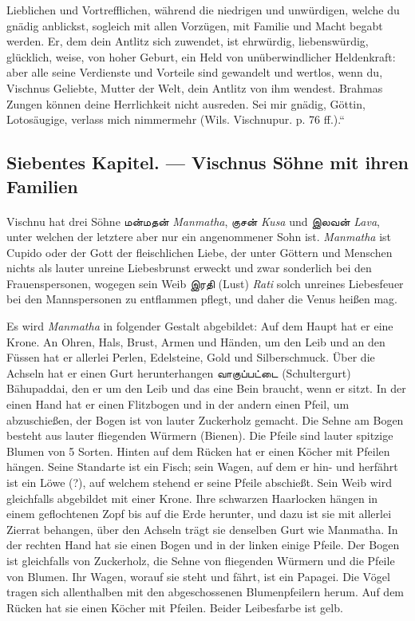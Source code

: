 \documentclass{article}
\newcommand{\TamilText}[1]{\texttamil{#1}}
\newcommand{\tam}[1]{\TamilText{#1}}
\begin{document}
Lieblichen und Vortrefflichen, während die niedrigen und unwürdigen, welche du gnädig anblickst, sogleich mit allen Vorzügen, mit Familie und Macht begabt werden. Er, dem dein Antlitz sich zuwendet, ist ehrwürdig, liebenswürdig, glücklich, weise, von hoher Geburt, ein Held von unüberwindlicher Heldenkraft: aber alle seine Verdienste und Vorteile sind gewandelt und wertlos, wenn du, Vischnus Geliebte, Mutter der Welt, dein Antlitz von ihm wendest. Brahmas Zungen können deine Herrlichkeit nicht ausreden. Sei mir gnädig, Göttin, Lotosäugige, verlass mich nimmermehr (Wils. Vischnupur. p. 76 ff.).“

\clearpage
\subsection{Siebentes Kapitel. — Vischnus Söhne mit ihren Familien}
\paragraph{}
Vischnu hat drei Söhne \tam{மன்மதன்} \emph{Manmatha}, \tam{குசன்} \emph{Kusa} und \tam{இலவன்} \emph{Lava}, unter welchen der letztere aber nur ein angenommener Sohn ist. \emph{Manmatha} ist Cupido oder der Gott der fleischlichen Liebe, der unter Göttern und Menschen nichts als lauter unreine Liebesbrunst erweckt und zwar sonderlich bei den Frauenspersonen, wogegen sein Weib \tam{இரதி} (Lust) \emph{Rati} solch unreines Liebesfeuer bei den Mannspersonen zu entflammen pflegt, und daher die Venus heißen mag.

Es wird \emph{Manmatha} in folgender Gestalt abgebildet: Auf dem Haupt hat er eine Krone. An Ohren, Hals, Brust, Armen und Händen, um den Leib und an den Füssen hat er allerlei Perlen, Edelsteine, Gold und Silberschmuck. Über die Achseln hat er einen Gurt herunterhangen \tam{வாகுப்பட்டை} (Schultergurt) B\={a}hupaddai, den er um den Leib und das eine Bein braucht, wenn er sitzt. In der einen Hand hat er einen Flitzbogen und in der andern einen Pfeil, um abzuschießen, der Bogen ist von lauter Zuckerholz gemacht. Die Sehne am Bogen besteht aus lauter fliegenden Würmern (Bienen). Die Pfeile sind lauter spitzige Blumen von 5 Sorten. Hinten auf dem Rücken hat er einen Köcher mit Pfeilen hängen. Seine Standarte ist ein Fisch; sein Wagen, auf dem er hin- und herfährt ist ein Löwe (?), auf welchem stehend er seine Pfeile abschießt. Sein Weib wird gleichfalls abgebildet mit einer Krone. Ihre schwarzen Haarlocken hängen in einem geflochtenen Zopf bis auf die Erde herunter, und dazu ist sie mit allerlei Zierrat behangen, über den Achseln trägt sie denselben Gurt wie Manmatha. In der rechten Hand hat sie einen Bogen und in der linken einige Pfeile. Der Bogen ist gleichfalls von Zuckerholz, die Sehne von fliegenden Würmern und die Pfeile von Blumen. Ihr Wagen, worauf sie steht und fährt, ist ein Papagei. Die Vögel tragen sich allenthalben mit den abgeschossenen Blumenpfeilern herum. Auf dem Rücken hat sie einen Köcher mit Pfeilen. Beider Leibesfarbe ist gelb.
\end{document}
